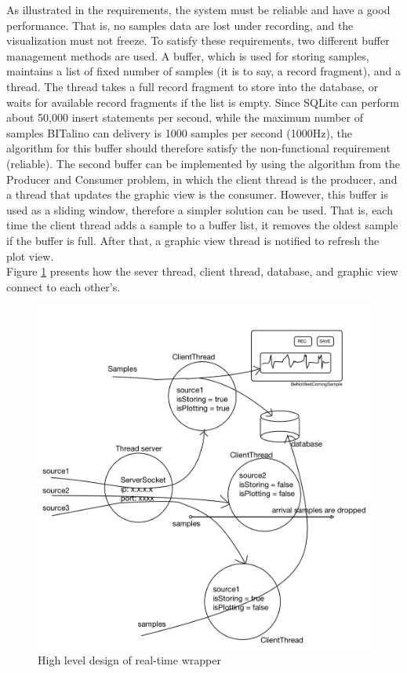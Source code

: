 As illustrated in the requirements, the system must be reliable and have a good performance. That is, no samples data are lost under recording, and the visualization must not freeze. To satisfy these requirements, two different buffer management methods are used. A buffer, which is used for storing samples, maintains a list of fixed number of samples (it is to say, a record fragment), and a thread. The thread takes a full record fragment to store into the database, or waits for available record fragments if the list is empty. Since SQLite can perform about 50,000\citep{SQLITEORG_INSERT} insert statements per second, while the maximum number of samples BITalino can delivery is 1000 samples per second (1000Hz), the algorithm for this buffer should therefore satisfy the non-functional requirement (reliable). The second buffer can be implemented by using the algorithm from the Producer and Consumer problem, in which the client thread is the producer, and a thread that updates the graphic view is the consumer. However, this buffer is used as a sliding window, therefore a simpler solution can be used. That is, each time the client thread adds a sample to a buffer list, it removes the oldest sample if the buffer is full. After that, a graphic view thread is notified to refresh the plot view.\\
Figure \ref{fig:Figures/ThreadsDBPlot} presents how the sever thread, client thread, database, and graphic view connect to each other’s.
\begin{figure}
    \centering
    \includegraphics[width=1.0\textwidth]{Figures/ThreadsDBPlot.png}
    \caption{High level design of real-time wrapper}
    \label{fig:Figures/ThreadsDBPlot}
\end{figure}
